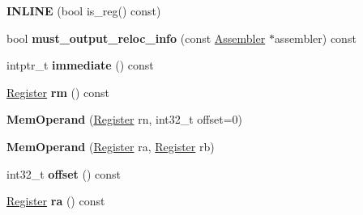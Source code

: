 \begin{DoxyCompactItemize}
\item 
{\bfseries I\+N\+L\+I\+NE} (bool is\+\_\+reg() const)\hypertarget{classv8_1_1internal_1_1_b_a_s_e___e_m_b_e_d_d_e_d_af96ed83955e2626794405e249b11dabd}{}\label{classv8_1_1internal_1_1_b_a_s_e___e_m_b_e_d_d_e_d_af96ed83955e2626794405e249b11dabd}

\item 
bool {\bfseries must\+\_\+output\+\_\+reloc\+\_\+info} (const \hyperlink{classv8_1_1internal_1_1_assembler}{Assembler} $\ast$assembler) const \hypertarget{classv8_1_1internal_1_1_b_a_s_e___e_m_b_e_d_d_e_d_a7de2cb63e5bc60d5444fef0f05f51808}{}\label{classv8_1_1internal_1_1_b_a_s_e___e_m_b_e_d_d_e_d_a7de2cb63e5bc60d5444fef0f05f51808}

\item 
intptr\+\_\+t {\bfseries immediate} () const \hypertarget{classv8_1_1internal_1_1_b_a_s_e___e_m_b_e_d_d_e_d_a078425f3a5bd61944d55ccebd04b1916}{}\label{classv8_1_1internal_1_1_b_a_s_e___e_m_b_e_d_d_e_d_a078425f3a5bd61944d55ccebd04b1916}

\item 
\hyperlink{structv8_1_1internal_1_1_register}{Register} {\bfseries rm} () const \hypertarget{classv8_1_1internal_1_1_b_a_s_e___e_m_b_e_d_d_e_d_a3b52dc72ba96afd1a2469b5e3e490851}{}\label{classv8_1_1internal_1_1_b_a_s_e___e_m_b_e_d_d_e_d_a3b52dc72ba96afd1a2469b5e3e490851}

\item 
{\bfseries Mem\+Operand} (\hyperlink{structv8_1_1internal_1_1_register}{Register} rn, int32\+\_\+t offset=0)\hypertarget{classv8_1_1internal_1_1_b_a_s_e___e_m_b_e_d_d_e_d_a037dd819e162e22fd86f74fa82075ce2}{}\label{classv8_1_1internal_1_1_b_a_s_e___e_m_b_e_d_d_e_d_a037dd819e162e22fd86f74fa82075ce2}

\item 
{\bfseries Mem\+Operand} (\hyperlink{structv8_1_1internal_1_1_register}{Register} ra, \hyperlink{structv8_1_1internal_1_1_register}{Register} rb)\hypertarget{classv8_1_1internal_1_1_b_a_s_e___e_m_b_e_d_d_e_d_ab842d2fcb540de5447d8352a98f136d2}{}\label{classv8_1_1internal_1_1_b_a_s_e___e_m_b_e_d_d_e_d_ab842d2fcb540de5447d8352a98f136d2}

\item 
int32\+\_\+t {\bfseries offset} () const \hypertarget{classv8_1_1internal_1_1_b_a_s_e___e_m_b_e_d_d_e_d_accdbab5ff0e51a3b9f685c77a11075e6}{}\label{classv8_1_1internal_1_1_b_a_s_e___e_m_b_e_d_d_e_d_accdbab5ff0e51a3b9f685c77a11075e6}

\item 
\hyperlink{structv8_1_1internal_1_1_register}{Register} {\bfseries ra} () const \hypertarget{classv8_1_1internal_1_1_b_a_s_e___e_m_b_e_d_d_e_d_a4ac8ffc7a949a14f784745835e432c0d}{}\label{classv8_1_1internal_1_1_b_a_s_e___e_m_b_e_d_d_e_d_a4ac8ffc7a949a14f784745835e432c0d}


\end{DoxyCompactItemize}
